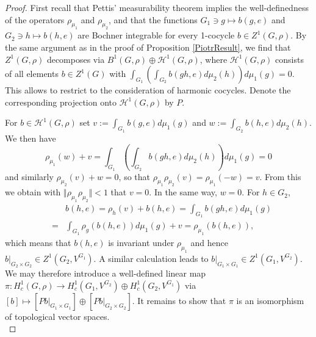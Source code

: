 \documentclass[a4paper,11pt,reqno]{amsart}
\numberwithin{equation}{section}
\theoremstyle{definition}
\theoremstyle{remark}
\theoremstyle{remark}
\begin{document}
\begin{proof} First recall that Pettis' measurability theorem implies the well-definedness of the operators $\rho_{\mu_{1}}$ and $\rho_{\mu_{2}}$, and that the functions $G_{1}\ni g\mapsto b(g,e)$ and $G_{2}\ni h\mapsto b(h,e)$ are Bochner integrable for every 1-cocycle $b\in Z^{1}(G,\rho)$. By the same argument as in the proof of Proposition \ref{PiotrResult}, we find that $Z^{1}(G,\rho)$ decomposes via $B^{1}(G,\rho)\oplus\mathcal{H}^{1}(G,\rho)$, where $\mathcal{H}^{1}(G,\rho)$ consists of all elements $b\in Z^{1}(G)$ with $\int_{G_{1}}(\int_{G_{2}}b(gh,e)d\mu_{2}(h))d\mu_{1}(g)=0$. This allows to restrict to the consideration of harmonic cocycles. Denote the corresponding projection onto $\mathcal{H}^{1}(G,\rho)$ by $P$.

For $b\in\mathcal{H}^{1}(G,\rho)$ set $v:=\int_{G_{1}}b(g,e)d\mu_{1}(g)$ and $w:=\int_{G_{2}}b(h,e)d\mu_{2}(h)$. We then have 
\[
\rho_{\mu_{1}}(w)+v=\int_{G_{1}}\left(\int_{G_{2}}b(gh,e)d\mu_{2}(h)\right)d\mu_{1}(g)=0
\]
and similarly $\rho_{\mu_{2}}(v)+w=0$, so that $\rho_{\mu_{1}}\rho_{\mu_{2}}(v)=\rho_{\mu_{1}}(-w)=v$. From this we obtain with $\Vert\rho_{\mu_{1}}\rho_{\mu_{2}}\Vert<1$ that $v=0$. In the same way, $w=0$. For $h\in G_{2}$, 
\begin{eqnarray*}
 &  & b(h,e)=\rho_{h}(v)+b(h,e)=\int_{G_{1}}b(gh,e)d\mu_{1}(g)\\
 & = & \int_{G_{1}}\rho_{g}\left(b(h,e)\right)d\mu_{1}(g)+v=\rho_{\mu_{1}}\left(b(h,e)\right),
\end{eqnarray*}
which means that $b(h,e)$ is invariant under $\rho_{\mu_1}$ and hence $b|_{G_{2}\times G_{2}}\in Z^{1}(G_{2},V^{G_{1}})$. A similar calculation leads to $b|_{G_{1}\times G_{1}}\in Z^{1}(G_{1},V^{G_{2}})$. We may therefore introduce a well-defined linear map $\pi:H_{c}^{1}(G,\rho)\rightarrow H_{c}^{1}(G_{1},V^{G_{2}})\oplus H_{c}^{1}(G_{2},V^{G_{1}})$ via $[b]\mapsto[Pb|_{G_{1}\times G_{1}}]\oplus[Pb|_{G_{2}\times G_{2}}]$. It remains to show that $\pi$ is an isomorphism of topological vector spaces.\\


\end{proof}
\end{document}
